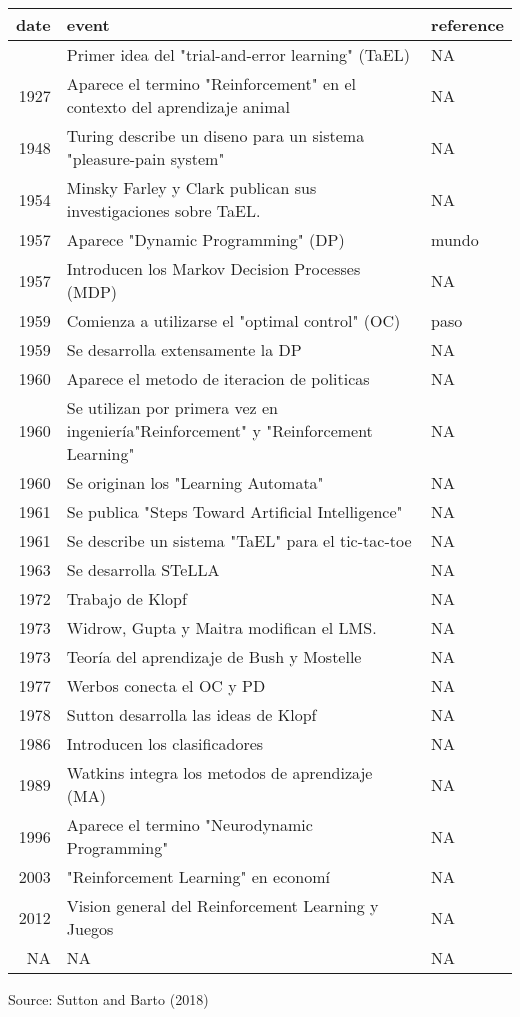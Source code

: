 \documentclass[
  letterpaper,
  DIV=11,
  numbers=noendperiod]{scrreprt}
\begin{document}
\begingroup
\fontsize{12.0pt}{14.4pt}\selectfont
\setlength{\LTpost}{0mm}
\begin{longtable*}{rll}
\toprule
date & event & reference \\ 
\midrule{} & Primer idea del "trial-and-error learning" (TaEL) & NA \\ 
{1927} & Aparece el termino "Reinforcement" en el contexto del aprendizaje animal & NA \\ 
{1948} & Turing describe un diseno para un sistema "pleasure-pain system" & NA \\ 
{1954} & Minsky Farley y Clark publican sus investigaciones sobre TaEL. & NA \\ 
{1957} & Aparece "Dynamic Programming" (DP) & mundo \\ 
{1957} & Introducen los Markov Decision Processes (MDP) & NA \\ 
{1959} & Comienza a utilizarse el "optimal control" (OC) & paso \\ 
{1959} & Se desarrolla extensamente la DP & NA \\ 
{1960} & Aparece el metodo de iteracion de politicas & NA \\ 
{1960} & Se utilizan por primera vez en ingeniería"Reinforcement" y "Reinforcement Learning" & NA \\ 
{1960} & Se originan los "Learning Automata" & NA \\ 
{1961} & Se publica "Steps Toward Artificial Intelligence" & NA \\ 
{1961} & Se describe un sistema "TaEL" para el tic-tac-toe & NA \\ 
{1963} & Se desarrolla STeLLA & NA \\ 
{1972} & Trabajo de Klopf & NA \\ 
{1973} & Widrow, Gupta y Maitra modifican el LMS. & NA \\ 
{1973} & Teoría del aprendizaje de Bush y Mostelle & NA \\ 
{1977} & Werbos conecta el OC y PD & NA \\ 
{1978} & Sutton desarrolla las ideas de Klopf & NA \\ 
{1986} & Introducen los clasificadores & NA \\ 
{1989} & Watkins integra los metodos de aprendizaje (MA) & NA \\ 
{1996} & Aparece el termino "Neurodynamic Programming" & NA \\ 
{2003} & "Reinforcement Learning" en economí & NA \\ 
{2012} & Vision general del Reinforcement Learning y Juegos & NA \\ 
{NA} & NA & NA \\ 
\bottomrule
\end{longtable*}
\begin{minipage}{\linewidth}
Source: Sutton and Barto (2018)\\
\end{minipage}
\endgroup
\end{document}
